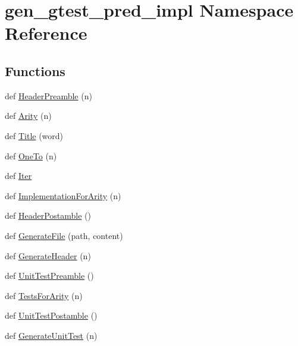 \hypertarget{namespacegen__gtest__pred__impl}{}\section{gen\+\_\+gtest\+\_\+pred\+\_\+impl Namespace Reference}
\label{namespacegen__gtest__pred__impl}
\subsection*{Functions}
\begin{DoxyCompactItemize}
\item 
def \hyperlink{namespacegen__gtest__pred__impl_a0b99cadcffab4bf161654a382163bac8}{Header\+Preamble} (n)
\item 
def \hyperlink{namespacegen__gtest__pred__impl_a5bbb7272f3588b969ab3ded6f49836a1}{Arity} (n)
\item 
def \hyperlink{namespacegen__gtest__pred__impl_ae49dd9bd9152dbcb3ca7994ce04c37ba}{Title} (word)
\item 
def \hyperlink{namespacegen__gtest__pred__impl_a7920598d51c9dded76a4ef9ffde339e4}{One\+To} (n)
\item 
def \hyperlink{namespacegen__gtest__pred__impl_a230080bd07390d99521308904d7f6e3c}{Iter}
\item 
def \hyperlink{namespacegen__gtest__pred__impl_a8c53b141b89f9c05d0131d9756dfeab0}{Implementation\+For\+Arity} (n)
\item 
def \hyperlink{namespacegen__gtest__pred__impl_a3d40c7ef70cf4d46e56c9612f34027bf}{Header\+Postamble} ()
\item 
def \hyperlink{namespacegen__gtest__pred__impl_a16210fe365dfd176e04aa2578ac5a8d9}{Generate\+File} (path, content)
\item 
def \hyperlink{namespacegen__gtest__pred__impl_a6f3039a82a5283846fb272f8a3af6743}{Generate\+Header} (n)
\item 
def \hyperlink{namespacegen__gtest__pred__impl_ae52dc86461d1b666c7b658a8c27c69f9}{Unit\+Test\+Preamble} ()
\item 
def \hyperlink{namespacegen__gtest__pred__impl_ab0da913fa15e5695d5bb2dd1de5dec57}{Tests\+For\+Arity} (n)
\item 
def \hyperlink{namespacegen__gtest__pred__impl_a57b922f50d0807896496dcd883c1f098}{Unit\+Test\+Postamble} ()
\item 
def \hyperlink{namespacegen__gtest__pred__impl_acbd42b5b7fb7ddbb06a4dd58fc37e9ed}{Generate\+Unit\+Test} (n)
\end{DoxyCompactItemize}
